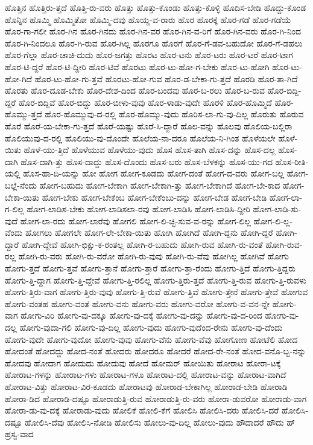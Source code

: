 {ಹೊತ್ತಿನ
ಹೊತ್ತಿರು-ತ್ತದೆ
ಹೊತ್ತಿ-ರು-ವರು
ಹೊತ್ತು
ಹೊತ್ತು-ಕೊಂಡು
ಹೊತ್ತು-ಕೊಳ್ಳಿ
ಹೊದಿಸ-ಬೇಡಿ
ಹೊದ್ದು-ಕೊಂಡ
ಹೊನ್ನಿನ
ಹೊಮ್ಮಿ
ಹೊಮ್ಮಿತೋ
ಹೊಮ್ಮಿ-ದವು
ಹೊಯ್ದ-ವ-ರಾರು
ಹೊರ
ಹೊರಕ್ಕೆ
ಹೊರ-ಗಡೆ
ಹೊರ-ಗಡೆಯೆ
ಹೊರ-ಗಾ-ಗಲೀ
ಹೊರ-ಗಿನ
ಹೊರ-ಗಿನದು
ಹೊರ-ಗಿನ-ವರ
ಹೊರ-ಗಿನ-ವ-ರಿಗೆ
ಹೊರ-ಗಿನ-ವರು
ಹೊರ-ಗಿ-ನಿಂದ
ಹೊರ-ಗಿ-ನಿಂದಲೂ
ಹೊರ-ಗಿ-ರುವ
ಹೊರ-ಗಿಲ್ಲ
ಹೊರಗೂ
ಹೊರಗೆ
ಹೊರ-ಗೆ-ಡವ-ಬಹುದೋ
ಹೊರ-ಗೆ-ಡಹಲು
ಹೊರ-ಗೆಲ್ಲಾ
ಹೊರ-ಚಾಚಿ-ದುದು
ಹೊರ-ಜಗತ್ತು
ಹೊರಟ
ಹೊರ-ಟನು
ಹೊರ-ಟರು
ಹೊರ-ಟರೆ
ಹೊರ-ಟಾಗ
ಹೊರ-ಟಿ-ದ್ದರೆ
ಹೊರ-ಟಿ-ದ್ದೀರಿ
ಹೊರ-ಟಿವೆ
ಹೊರಟು
ಹೊರ-ಟು-ಹೋ-ಗ-ಬೇಕು
ಹೊರ-ಟು-ಹೋಗಿ
ಹೊರ-ಟು-ಹೋ-ಗಿದೆ
ಹೊರ-ಟು-ಹೋ-ಗು-ತ್ತವೆ
ಹೊರಟು-ಹೋ-ಗುವ
ಹೊರ-ಡ-ಬೇಕಾ-ಗು-ತ್ತದೆ
ಹೊರಡಿ
ಹೊರ-ತಾ-ಗಿದೆ
ಹೊರತು
ಹೊರ-ದೂಡ-ಬೇಕು
ಹೊರ-ದೇಶ-ದಿಂದ
ಹೊರ-ಬಂದವು
ಹೊರ-ಬ-ರಲು
ಹೊರ-ಬ-ರುವ
ಹೊರ-ಬಿದ್ದಿ-ದ್ದರೆ
ಹೊರ-ಬಿದ್ದಿವೆ
ಹೊರ-ಬಿದ್ದು
ಹೊರ-ಬೀಳು-ವುವು
ಹೊರ-ಳಾಡು-ವುದೇ
ಹೊರಳಿ
ಹೊರ-ಹೊಮ್ಮಿದೆ
ಹೊರ-ಹೊಮ್ಮು-ತ್ತದೆ
ಹೊರ-ಹೊಮ್ಮುವು-ದ-ರಲ್ಲಿ
ಹೊರ-ಹೊಮ್ಮು-ವುದು
ಹೊರಿಸ-ಲಾ-ಗು-ವು-ದಿಲ್ಲ
ಹೊರುತು
ಹೊರುವ
ಹೊರೆ
ಹೊರೆ-ಯ-ಬೇಕಾ-ಗು-ತ್ತದೆ
ಹೊರೆ-ಯಷ್ಟು
ಹೊರೆ-ಸಿ-ದ್ದಾರೆ
ಹೊಲ-ವನ್ನು
ಹೊಲವು
ಹೊಲಿಯ-ಬಲ್ಲಿರಾ
ಹೊಲಿಯುವು-ದ-ರಲ್ಲಿ
ಹೊಲಿಯು-ವು-ದೊಂದೇ
ಹೊಲೆಯ-ನಾ-ದರೂ
ಹೊಲೆಯ-ನಿ-ಗಿಂತ
ಹೊಳೆಯಲೇ
ಹೊಳೆ-ಯಿತು
ಹೊಳೆ-ಯು-ತ್ತಿದೆ
ಹೊಳೆಯುವ
ಹೊಳೆಯು-ವುದು
ಹೊಸ
ಹೊಸ-ತಾಗಿ
ಹೊಸ-ದನ್ನು
ಹೊಸ-ದಲ್ಲ
ಹೊಸ-ದಾಗಿ
ಹೊಸ-ದಾಗಿ-ತ್ತು
ಹೊಸ-ದಾದ್ದು
ಹೊಸ-ದೊಂದು
ಹೊಸ-ಬರು
ಹೊಸ-ಬೆಳಕನ್ನು
ಹೊಸ-ಯು-ಗದ
ಹೊಸ-ರೀತಿ-ಯಲ್ಲಿ
ಹೊಸ-ಹಾ-ದಿ-ಯನ್ನು
ಹೋ
ಹೋಗ
ಹೋಗ-ಕೂಡದು
ಹೋಗ-ದಂತೆ
ಹೋಗ-ದ-ವರು
ಹೋಗ-ಬಲ್ಲ
ಹೋಗ-ಬಲ್ಲೆ-ನೆಂದು
ಹೋಗ-ಬಹುದು
ಹೋಗ-ಬೇಕಾಗಿ
ಹೋಗ-ಬೇಕಾಗಿ-ತ್ತು
ಹೋಗ-ಬೇಕಾಗಿದೆ
ಹೋಗ-ಬೇ-ಕಾದ
ಹೋಗ-ಬೇಕಾ-ಯಿತು
ಹೋಗ-ಬೇಕು
ಹೋಗ-ಬೇಕೆಂಬ
ಹೋಗ-ಬೇಕೆಂಬು-ದನ್ನು
ಹೋಗ-ಬೇಡ
ಹೋಗ-ಬೇಡಿ
ಹೋಗ-ಲಾ-ಗ-ಲಿಲ್ಲ
ಹೋಗ-ಲಾಡಿಸ-ಬೇಕು
ಹೋಗ-ಲಾಡಿಸಲಾ-ರವು
ಹೋಗ-ಲಾಡಿಸಿ
ಹೋಗ-ಲಾಡಿಸಿ-ದ್ದೀರಿ
ಹೋಗ-ಲಾಡಿ-ಸು-ವುದೆ
ಹೋಗ-ಲಾ-ರದು
ಹೋಗ-ಲಾರೆವು
ಹೋಗಲಿ
ಹೋಗ-ಲಿ-ಚ್ಛಿ-ಸುವ-ವ-ರನ್ನು
ಹೋಗ-ಲಿಲ್ಲ
ಹೋಗ-ಲಿ-ಲ್ಲ-ವೆಂದು
ಹೋಗಲು
ಹೋಗಲೇ
ಹೋಗ-ಲೇ-ಬೇಕಾ-ಯಿತು
ಹೋಗಿ
ಹೋಗಿದೆ
ಹೋಗಿ-ದ್ದನು
ಹೋಗಿ-ದ್ದರೆ
ಹೋಗಿ-ದ್ದಾರೆ
ಹೋಗಿ-ದ್ದೇವೆ
ಹೋಗಿ-ಭಿಕ್ಷು-ಕ-ರಂತಲ್ಲ
ಹೋಗಿ-ರ-ಬಹುದು
ಹೋಗಿ-ರುವ
ಹೋಗಿ-ರು-ವಂತೆ
ಹೋಗಿ-ರುವ-ರಲ್ಲ
ಹೋಗಿ-ರು-ವರು
ಹೋಗಿ-ರು-ವರೋ
ಹೋಗಿ-ರು-ವುವು
ಹೋಗಿ-ರು-ವೆವು
ಹೋಗಿಲ್ಲ
ಹೋಗಿವೆ
ಹೋಗು
ಹೋಗು-ತ್ತದೆ
ಹೋಗು-ತ್ತವೆ
ಹೋಗು-ತ್ತಾನೆ
ಹೋಗು-ತ್ತಾರೆ
ಹೋಗು-ತ್ತಾ-ರೆಂದು
ಹೋಗು-ತ್ತಿದೆ
ಹೋಗು-ತ್ತಿದ್ದರು
ಹೋಗು-ತ್ತಿ-ದ್ದಾಗ
ಹೋಗು-ತ್ತಿ-ದ್ದೇವೆ
ಹೋಗು-ತ್ತಿ-ರಲಿಲ್ಲ
ಹೋಗು-ತ್ತಿರು-ತ್ತದೆ
ಹೋಗು-ತ್ತಿ-ರುವ
ಹೋಗು-ತ್ತಿ-ರುವಳು
ಹೋಗು-ತ್ತಿರು-ವಾಗ
ಹೋಗು-ತ್ತಿರು-ವುವು
ಹೋಗು-ತ್ತಿ-ರುವೆ
ಹೋಗು-ತ್ತಿವೆ
ಹೋಗು-ತ್ತೇನೆ
ಹೋಗು-ತ್ತೇವೆ
ಹೋಗುವ
ಹೋಗು-ವಂತಹ
ಹೋಗು-ವಂತೆ
ಹೋಗು-ವನು
ಹೋಗು-ವರು
ಹೋಗು-ವರೋ
ಹೋಗು-ವ-ವನ-ನ್ನೇ
ಹೋಗು-ವಾಗ
ಹೋಗು-ವಿರಿ
ಹೋಗು-ವು-ದಕ್ಕೂ
ಹೋಗು-ವು-ದಕ್ಕೆ
ಹೋಗು-ವು-ದನ್ನು
ಹೋಗು-ವು-ದ-ರಿಂದ
ಹೋಗು-ವು-ದಲ್ಲ
ಹೋಗು-ವುದಾ-ಗಲಿ
ಹೋಗು-ವು-ದಿಲ್ಲ
ಹೋಗು-ವುದು
ಹೋಗು-ವುದೆಂದ-ರೇನು
ಹೋಗು-ವು-ದೆಂದು
ಹೋಗು-ವುದೇ
ಹೋಗು-ವುದೋ
ಹೋಗು-ವುವು
ಹೋಗು-ವೆನು
ಹೋಗು-ವೆವು
ಹೋಗೋಣ
ಹೋಟೆಲಿ
ಹೋದ
ಹೋದಂತೆ
ಹೋದದ್ದು
ಹೋದ-ನಂತೆ
ಹೋದರು
ಹೋದರೂ
ಹೋದರೆ
ಹೋದ-ರೇ-ನಂತೆ
ಹೋದ-ವನೊ-ಬ್ಬ-ನನ್ನು
ಹೋದವು
ಹೋದಾಗ
ಹೋದುದು
ಹೋದುವು
ಹೋದೆ
ಹೋಮರ್
ಹೋಯಿತು
ಹೋರಾಟ
ಹೋರಾ-ಟಕ್ಕೆ
ಹೋರಾಟ-ಗಳನ್ನು
ಹೋರಾಟ-ಗಳು
ಹೋರಾಟ-ಗಳೂ
ಹೋರಾಟ-ದಲ್ಲಿ
ಹೋರಾಟ-ವನ್ನು
ಹೋರಾಟ-ವಾಗಿದೆ
ಹೋರಾಟ-ವಿತ್ತು
ಹೋರಾಟ-ವಿರ-ಕೂಡದು
ಹೋರಾಟವು
ಹೋರಾಡ-ಬೇಕಾಗಿಲ್ಲ
ಹೋರಾಡ-ಬೇಡಿ
ಹೋರಾಡಿ
ಹೋರಾ-ಡಿದ
ಹೋರಾಡಿ-ದಷ್ಟೂ
ಹೋರಾಡುತ್ತಿ-ರುವ
ಹೋರಾಡುತ್ತಿ-ರು-ವರು
ಹೋರಾ-ಡುವರೋ
ಹೋರಾಡು-ವಾಗ
ಹೋರಾ-ಡು-ವು-ದಕ್ಕೆ
ಹೋರಾಡು-ವುದು
ಹೋಲಿಕೆ
ಹೋಲಿ-ಕೆಗೆ
ಹೋಲಿಸಿ
ಹೋಲಿಸಿ-ದರು
ಹೋಲಿಸಿ-ದರೆ
ಹೋಲಿಸಿ-ದಷ್ಟೂ
ಹೋಲಿಸಿ-ದೆವು
ಹೋಲಿಸಿ-ನೋಡಿ
ಹೋಲಿಸು
ಹೋಲು-ವು-ದಿಲ್ಲ
ಹೋಲು-ವುದು
ಹೌದಾದರೆ
ಹೌದು
ಹ್
ಹ್ರಸ್ವ-ವಾದ
}
